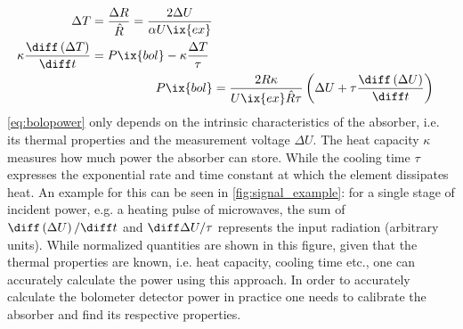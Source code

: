 %
                \begin{align}%
                    \begin{split}\label{eq:resistance_power}%
                        \Delta T&=\frac{\Delta R}{\hat{R}}=\frac{2\Delta U}{\alpha U\ix{ex}}\\%
                        \kappa\frac{\diff\left(\Delta T\right)}{\diff t}&=P\ix{bol}-\kappa\frac{\Delta T}{\tau}%
                    \end{split}\\%
                    P\ix{bol}&=\frac{2R\kappa}{U\ix{ex}\hat{R}\tau}\left(\Delta U+\tau\frac{\diff\left(\Delta U\right)}{\diff t}\right)\label{eq:bolopower}
                \end{align}%
%
                \autoref{eq:bolopower} only depends on the intrinsic characteristics of the absorber, i.e. its thermal properties and the measurement voltage $\Delta U$. The heat capacity $\kappa$ measures how much power the absorber can store. While the cooling time $\tau$ expresses the exponential rate and time constant at which the element dissipates heat. An example for this can be seen in \cref{fig:signal_example}: for a single stage of incident power, e.g. a heating pulse of microwaves, the sum of $\diff\left(\Delta U\right)/\diff t$ and $\diff\Delta U/\tau$ represents the input radiation (arbitrary units). While normalized quantities are shown in this figure, given that the thermal properties are known, i.e. heat capacity, cooling time etc., one can accurately calculate the power using this approach. In order to accurately calculate the bolometer detector power in practice one needs to calibrate the absorber and find its respective properties.%
%
